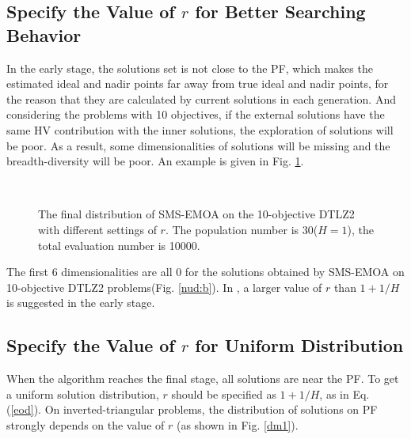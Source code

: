 \documentclass[conference]{IEEEtran}
\begin{document}
\subsection{Specify the Value of $r$ for Better Searching Behavior}
In the early stage, the solutions set is not close to the PF, which makes the 
estimated ideal and nadir points far away from true ideal and nadir points, for the reason that
they are calculated by current solutions in each generation. 
And considering the problems with 10 objectives, 
if the external solutions have the same HV contribution with the inner solutions, 
the exploration of solutions will be poor. 
As a result, some dimensionalities of solutions will be missing and the breadth-diversity\cite{DtA} will be poor. 
An example is given in Fig. \ref{nud}. 
\begin{figure}[!t]
  \centering
  \quad
  \\
  \caption{
    The final distribution of SMS-EMOA on the 10-objective DTLZ2 with different settings of $r$. 
    The population number is 30($H=1$), the total evaluation number is 10000.
  }
  \label{nud}
\end{figure} 
The first 6 dimensionalities are all 0 for the solutions obtained by SMS-EMOA on 10-objective DTLZ2 problems(Fig. \ref{nud:b}). 
In \cite{hisao:dynamic}, a larger value of $r$ than $1+1/H$ is suggested in the early stage. 

\subsection{Specify the Value of $r$ for Uniform Distribution}
When the algorithm reaches the final stage, all solutions are near the PF. 
To get a uniform solution distribution, $r$ should be specified as $1+1/H$, as in Eq. (\ref{eod}). 
On inverted-triangular problems, the distribution of solutions on PF
strongly depends on the value of $r$ (as shown in Fig. \ref{dm1}). 
\end{document}
